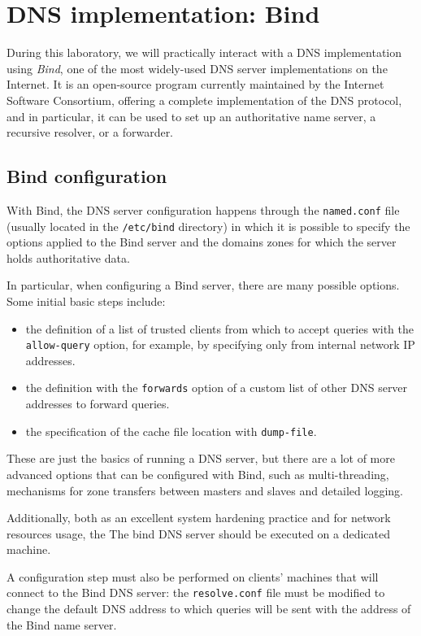 \documentclass[11pt,a4paper]{article}
\begin{document}
\section{DNS implementation: Bind}

During this laboratory, we will practically interact with a DNS implementation using \textit{Bind}, one of the most widely-used DNS server implementations on the Internet. It is an open-source program currently
maintained by the Internet Software Consortium, offering a complete
implementation of the DNS protocol, and in particular, it can be used to set up an authoritative
name server, a recursive resolver, or a forwarder.

\subsection{Bind configuration}

With Bind, the DNS server configuration happens through the \texttt{named.conf} file (usually located
in the \texttt{/etc/bind} directory) in which it is possible to specify the options applied to the Bind server and
the domains zones for which the server holds authoritative data.

\noindent
In particular, when configuring a Bind server, there are many possible options. Some initial
basic steps include:
\begin{itemize}
\item the definition of a list of trusted clients from which to accept queries with the \texttt{allow-query}
option, for example, by specifying only from internal network IP addresses.
\item the definition with the \texttt{forwards} option of a custom list of other DNS server addresses to
forward queries.
\item the specification of the cache file location with \texttt{dump-file}. 
\end{itemize}
These are just the basics of running a DNS server, but there are a lot of more advanced
options that can be configured with Bind, such as multi-threading, mechanisms for zone transfers
between masters and slaves and detailed logging.

\noindent
Additionally, both as an excellent system hardening practice and for network resources usage, the
The bind DNS server should be executed on a dedicated machine.

\noindent
A configuration step must also be performed on clients' machines that will connect to the Bind
DNS server: the \texttt{resolve.conf} file must be modified to change the default DNS address to
which queries will be sent with the address of the Bind name server.
\end{document}
